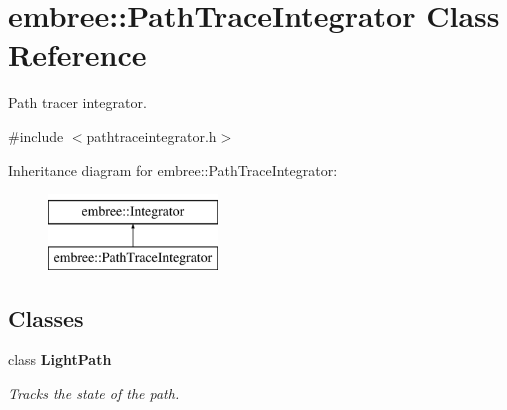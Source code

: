 \hypertarget{classembree_1_1_path_trace_integrator}{
\section{embree::PathTraceIntegrator Class Reference}
\label{classembree_1_1_path_trace_integrator}
}


Path tracer integrator.  




{\ttfamily \#include $<$pathtraceintegrator.h$>$}

Inheritance diagram for embree::PathTraceIntegrator:\begin{figure}[H]
\begin{center}
\leavevmode
\includegraphics[height=2.000000cm]{classembree_1_1_path_trace_integrator}
\end{center}
\end{figure}
\subsection*{Classes}
\begin{DoxyCompactItemize}
\item 
class {\bfseries LightPath}
\begin{DoxyCompactList}\small\item\em Tracks the state of the path. \item\end{DoxyCompactList}\end{DoxyCompactItemize}
